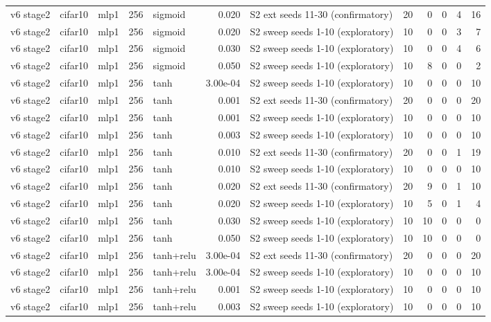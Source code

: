 \begin{table}[htbp]
{\begin{tabular}{@{}lllrlrlrrrrr@{}}
v6 stage2 & cifar10 & mlp1 & 256 & sigmoid & 0.020 & S2 ext seeds 11-30 (confirmatory) & 20 & 0 & 0 & 4 & 16 \\
v6 stage2 & cifar10 & mlp1 & 256 & sigmoid & 0.020 & S2 sweep seeds 1-10 (exploratory) & 10 & 0 & 0 & 3 & 7 \\
v6 stage2 & cifar10 & mlp1 & 256 & sigmoid & 0.030 & S2 sweep seeds 1-10 (exploratory) & 10 & 0 & 0 & 4 & 6 \\
v6 stage2 & cifar10 & mlp1 & 256 & sigmoid & 0.050 & S2 sweep seeds 1-10 (exploratory) & 10 & 8 & 0 & 0 & 2 \\
v6 stage2 & cifar10 & mlp1 & 256 & tanh & 3.00e-04 & S2 sweep seeds 1-10 (exploratory) & 10 & 0 & 0 & 0 & 10 \\
v6 stage2 & cifar10 & mlp1 & 256 & tanh & 0.001 & S2 ext seeds 11-30 (confirmatory) & 20 & 0 & 0 & 0 & 20 \\
v6 stage2 & cifar10 & mlp1 & 256 & tanh & 0.001 & S2 sweep seeds 1-10 (exploratory) & 10 & 0 & 0 & 0 & 10 \\
v6 stage2 & cifar10 & mlp1 & 256 & tanh & 0.003 & S2 sweep seeds 1-10 (exploratory) & 10 & 0 & 0 & 0 & 10 \\
v6 stage2 & cifar10 & mlp1 & 256 & tanh & 0.010 & S2 ext seeds 11-30 (confirmatory) & 20 & 0 & 0 & 1 & 19 \\
v6 stage2 & cifar10 & mlp1 & 256 & tanh & 0.010 & S2 sweep seeds 1-10 (exploratory) & 10 & 0 & 0 & 0 & 10 \\
v6 stage2 & cifar10 & mlp1 & 256 & tanh & 0.020 & S2 ext seeds 11-30 (confirmatory) & 20 & 9 & 0 & 1 & 10 \\
v6 stage2 & cifar10 & mlp1 & 256 & tanh & 0.020 & S2 sweep seeds 1-10 (exploratory) & 10 & 5 & 0 & 1 & 4 \\
v6 stage2 & cifar10 & mlp1 & 256 & tanh & 0.030 & S2 sweep seeds 1-10 (exploratory) & 10 & 10 & 0 & 0 & 0 \\
v6 stage2 & cifar10 & mlp1 & 256 & tanh & 0.050 & S2 sweep seeds 1-10 (exploratory) & 10 & 10 & 0 & 0 & 0 \\
v6 stage2 & cifar10 & mlp1 & 256 & tanh+relu & 3.00e-04 & S2 ext seeds 11-30 (confirmatory) & 20 & 0 & 0 & 0 & 20 \\
v6 stage2 & cifar10 & mlp1 & 256 & tanh+relu & 3.00e-04 & S2 sweep seeds 1-10 (exploratory) & 10 & 0 & 0 & 0 & 10 \\
v6 stage2 & cifar10 & mlp1 & 256 & tanh+relu & 0.001 & S2 sweep seeds 1-10 (exploratory) & 10 & 0 & 0 & 0 & 10 \\
v6 stage2 & cifar10 & mlp1 & 256 & tanh+relu & 0.003 & S2 sweep seeds 1-10 (exploratory) & 10 & 0 & 0 & 0 & 10 \\

\end{tabular}}
\end{table}
